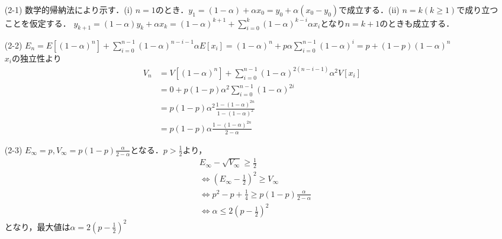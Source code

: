 \documentclass[a4j]{jarticle}
\let \ds \displaystyle
\begin{document}
\begin{itemize}
 \item[(2-1)] 数学的帰納法により示す．(i) $n=1$のとき．$y_1 = (1-\alpha) + \alpha x_0 = y_0 + \alpha(x_0-y_0)$で成立する．(ii) $n=k(k\geq 1)$で成り立つことを仮定する．
              $\ds y_{k+1}=(1-\alpha)y_k + \alpha x_k = (1-\alpha)^{k+1} + \sum_{i=0}^{k}(1-\alpha)^{k-i}\alpha x_i $となり$n=k+1$のときも成立する．
 \item[(2-2)] $\ds E_n = E[(1-\alpha)^n] + \sum_{i=0}^{n-1}(1-\alpha)^{n-i-1}\alpha E[x_i] = (1-\alpha)^n + p\alpha \sum_{i=0}^{n-1}(1-\alpha)^i = p + (1-p)(1-\alpha)^n$ \\
              $x_i$の独立性より \\
              \begin{align*}
               V_n &= V[(1-\alpha)^n] + \sum_{i=0}^{n-1}(1-\alpha)^{2(n-i-1)}\alpha^2 V[x_i] \\
               &= 0 + p(1-p)\alpha^2 \sum_{i=0}^{n-1}(1-\alpha)^{2i} \\
               &= p(1-p)\alpha^2\frac{1-(1-\alpha)^{2n}}{1-(1-\alpha)^2} \\
               &= p(1-p)\alpha \frac{1-(1-\alpha)^{2n}}{2-\alpha}
              \end{align*}
 \item[(2-3)] $\ds E_\infty=p,V_\infty = p(1-p)\frac{\alpha}{2-\alpha}$となる．$\ds p>\frac{1}{2}$より，
              \begin{align*}
               &E_\infty - \sqrt{V_\infty} \geq \frac{1}{2} \\
               &\Leftrightarrow \left(E_\infty - \frac{1}{2} \right)^2  \geq V_\infty \\
               &\Leftrightarrow p^2 - p + \frac{1}{4} \geq p(1-p)\frac{\alpha}{2-\alpha} \\
               &\Leftrightarrow \alpha \leq 2\left(p-\frac{1}{2}\right)^2
              \end{align*}
              となり，最大値は$\ds \alpha = 2\left(p-\frac{1}{2}\right)^2$
\end{itemize}
\end{document}
